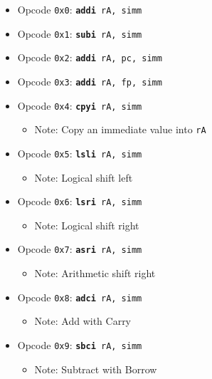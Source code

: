 \documentclass{article}
\begin{document}
	\singlespacing
	\begin{itemize}
		\item Opcode \texttt{0x0}:
			\texttt{\textbf{addi} rA, simm}
		\item Opcode \texttt{0x1}:
			\texttt{\textbf{subi} rA, simm}
		\item Opcode \texttt{0x2}:
			\texttt{\textbf{addi} rA, pc, simm}
		\item Opcode \texttt{0x3}:
			\texttt{\textbf{addi} rA, fp, simm}
		\item Opcode \texttt{0x4}:
			\texttt{\textbf{cpyi} rA, simm}
		\begin{itemize}
			\item Note:  Copy an immediate value into \texttt{rA}
		\end{itemize}
		\item Opcode \texttt{0x5}:
			\texttt{\textbf{lsli} rA, simm}
		\begin{itemize}
			\item Note:  Logical shift left
		\end{itemize}
		\item Opcode \texttt{0x6}:
			\texttt{\textbf{lsri} rA, simm}
		\begin{itemize}
			\item Note:  Logical shift right
		\end{itemize}
		\item Opcode \texttt{0x7}:
			\texttt{\textbf{asri} rA, simm}
		\begin{itemize}
			\item Note:  Arithmetic shift right
		\end{itemize}
		\item Opcode \texttt{0x8}:
			\texttt{\textbf{adci} rA, simm}
		\begin{itemize}
			\item Note:  Add with Carry
		\end{itemize}
		\item Opcode \texttt{0x9}:
			\texttt{\textbf{sbci} rA, simm}
		\begin{itemize}
			\item Note:  Subtract with Borrow

\end{itemize}
\end{itemize}
\end{document}
